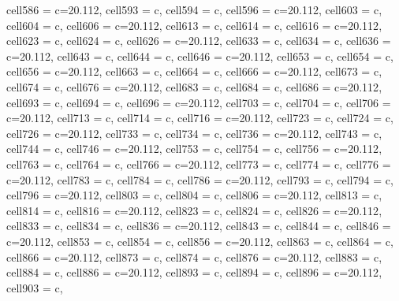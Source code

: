 \documentclass{article}
\begin{document}
{\begin{longtblr}[
  caption = {Survey responses for confirmed time series (6 responses), wastewater (5 responses), deaths (XX responses), and transmission pairs (XX responses).},
  label = {tab:placeholder_label},
]
{  cell{58}{6} = {c=2}{0.112\linewidth},
  cell{59}{3} = {c},
  cell{59}{4} = {c},
  cell{59}{6} = {c=2}{0.112\linewidth},
  cell{60}{3} = {c},
  cell{60}{4} = {c},
  cell{60}{6} = {c=2}{0.112\linewidth},
  cell{61}{3} = {c},
  cell{61}{4} = {c},
  cell{61}{6} = {c=2}{0.112\linewidth},
  cell{62}{3} = {c},
  cell{62}{4} = {c},
  cell{62}{6} = {c=2}{0.112\linewidth},
  cell{63}{3} = {c},
  cell{63}{4} = {c},
  cell{63}{6} = {c=2}{0.112\linewidth},
  cell{64}{3} = {c},
  cell{64}{4} = {c},
  cell{64}{6} = {c=2}{0.112\linewidth},
  cell{65}{3} = {c},
  cell{65}{4} = {c},
  cell{65}{6} = {c=2}{0.112\linewidth},
  cell{66}{3} = {c},
  cell{66}{4} = {c},
  cell{66}{6} = {c=2}{0.112\linewidth},
  cell{67}{3} = {c},
  cell{67}{4} = {c},
  cell{67}{6} = {c=2}{0.112\linewidth},
  cell{68}{3} = {c},
  cell{68}{4} = {c},
  cell{68}{6} = {c=2}{0.112\linewidth},
  cell{69}{3} = {c},
  cell{69}{4} = {c},
  cell{69}{6} = {c=2}{0.112\linewidth},
  cell{70}{3} = {c},
  cell{70}{4} = {c},
  cell{70}{6} = {c=2}{0.112\linewidth},
  cell{71}{3} = {c},
  cell{71}{4} = {c},
  cell{71}{6} = {c=2}{0.112\linewidth},
  cell{72}{3} = {c},
  cell{72}{4} = {c},
  cell{72}{6} = {c=2}{0.112\linewidth},
  cell{73}{3} = {c},
  cell{73}{4} = {c},
  cell{73}{6} = {c=2}{0.112\linewidth},
  cell{74}{3} = {c},
  cell{74}{4} = {c},
  cell{74}{6} = {c=2}{0.112\linewidth},
  cell{75}{3} = {c},
  cell{75}{4} = {c},
  cell{75}{6} = {c=2}{0.112\linewidth},
  cell{76}{3} = {c},
  cell{76}{4} = {c},
  cell{76}{6} = {c=2}{0.112\linewidth},
  cell{77}{3} = {c},
  cell{77}{4} = {c},
  cell{77}{6} = {c=2}{0.112\linewidth},
  cell{78}{3} = {c},
  cell{78}{4} = {c},
  cell{78}{6} = {c=2}{0.112\linewidth},
  cell{79}{3} = {c},
  cell{79}{4} = {c},
  cell{79}{6} = {c=2}{0.112\linewidth},
  cell{80}{3} = {c},
  cell{80}{4} = {c},
  cell{80}{6} = {c=2}{0.112\linewidth},
  cell{81}{3} = {c},
  cell{81}{4} = {c},
  cell{81}{6} = {c=2}{0.112\linewidth},
  cell{82}{3} = {c},
  cell{82}{4} = {c},
  cell{82}{6} = {c=2}{0.112\linewidth},
  cell{83}{3} = {c},
  cell{83}{4} = {c},
  cell{83}{6} = {c=2}{0.112\linewidth},
  cell{84}{3} = {c},
  cell{84}{4} = {c},
  cell{84}{6} = {c=2}{0.112\linewidth},
  cell{85}{3} = {c},
  cell{85}{4} = {c},
  cell{85}{6} = {c=2}{0.112\linewidth},
  cell{86}{3} = {c},
  cell{86}{4} = {c},
  cell{86}{6} = {c=2}{0.112\linewidth},
  cell{87}{3} = {c},
  cell{87}{4} = {c},
  cell{87}{6} = {c=2}{0.112\linewidth},
  cell{88}{3} = {c},
  cell{88}{4} = {c},
  cell{88}{6} = {c=2}{0.112\linewidth},
  cell{89}{3} = {c},
  cell{89}{4} = {c},
  cell{89}{6} = {c=2}{0.112\linewidth},
  cell{90}{3} = {c},
}
\end{longtblr}}
\end{document}
